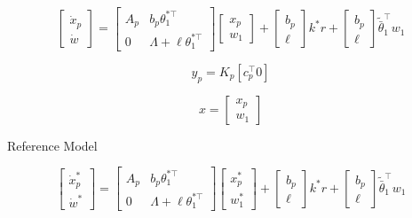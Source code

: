\begin{equation*}
  \begin{bmatrix}
    \dot{x}_{p} \\ \dot{w}
  \end{bmatrix}=
  \begin{bmatrix}
    A_{p} & b_{p}\theta_{1}^{*\top} \\
    0 & \Lambda+\ell\theta_{1}^{*\top}
  \end{bmatrix}
  \begin{bmatrix}
    x_{p} \\ w_{1}
  \end{bmatrix}
  +
  \begin{bmatrix}
    b_{p} \\ \ell
  \end{bmatrix}
  k^{*}r+
  \begin{bmatrix}
    b_{p} \\ \ell
  \end{bmatrix}
  \tilde{\bar{\theta}}_{1}^{\top}w_{1}
\end{equation*}

\begin{equation*}
  y_{p}=K_{p}[c_{p}^{\top} 0]
\end{equation*}

\begin{equation*}
  x=
  \begin{bmatrix}
    x_{p} \\ w_{1}
  \end{bmatrix}
\end{equation*}

Reference Model

\begin{equation*}
  \begin{bmatrix}
    \dot{x}_{p}^{*} \\ \dot{w}^{*}
  \end{bmatrix}=
  \begin{bmatrix}
    A_{p} & b_{p}\theta_{1}^{*\top} \\
    0 & \Lambda+\ell\theta_{1}^{*\top}
  \end{bmatrix}
  \begin{bmatrix}
    x_{p}^{*} \\ w_{1}^{*}
  \end{bmatrix}
  +
  \begin{bmatrix}
    b_{p} \\ \ell
  \end{bmatrix}
  k^{*}r+
  \begin{bmatrix}
    b_{p} \\ \ell
  \end{bmatrix}
  \tilde{\bar{\theta}}_{1}^{\top}w_{1}
\end{equation*}

